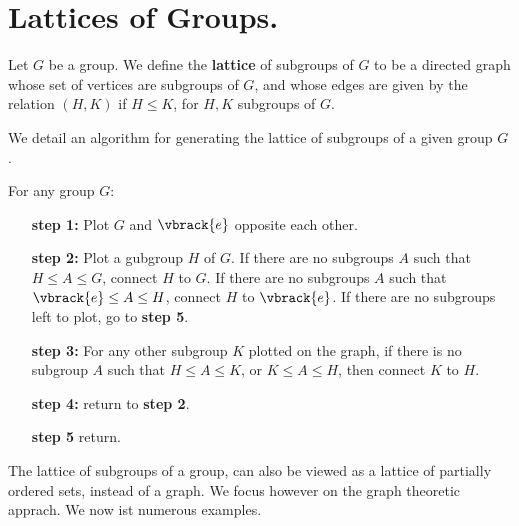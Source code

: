 \section{Lattices of Groups.}
\label{section1}

\begin{definition}
    Let $G$ be a group. We define the  \textbf{lattice} of subgroups of $G$ to
    be a directed graph whose set of vertices are subgroups of  $G$, and whose
    edges are given by the relation $(H,K)$ if $H \leq K$, for  $H,K$ subgroups
    of  $G$.
\end{definition}

We detail an algorithm for generating the lattice of subgroups of a given group
$G$.

\begin{algorithm}
    For any group $G$:
    \begin{enumerate}
        \item[\textbf{step 1:}] Plot $G$ and  $\vbrack{e}$ opposite each other.

        \item[\textbf{step 2:}] Plot a gubgroup $H$ of  $G$. If there are no
            subgroups $A$ such that $H \leq A \leq G$, connect  $H$ to  $G$. If
            there are no subgroups $A$ such that  $\vbrack{e} \leq A \leq H$,
            connect $H$ to  $\vbrack{e}$. If there are no subgroups left to
            plot, go to \textbf{step 5}.

        \item[\textbf{step 3:}] For any other subgroup $K$ plotted on the graph,
            if there is no subgroup $A$ such that  $H \leq A \leq K$, or $K \leq
            A \leq H$, then connect  $K$ to  $H$.

        \item[\textbf{step 4:}] return to \textbf{step 2}.

        \item[\textbf{step 5}] return.
    \end{enumerate}
\end{algorithm}

The lattice of subgroups of a group, can also be viewed as a lattice of
partially ordered sets, instead of a graph. We focus however on the graph
theoretic apprach. We now ist numerous examples.

